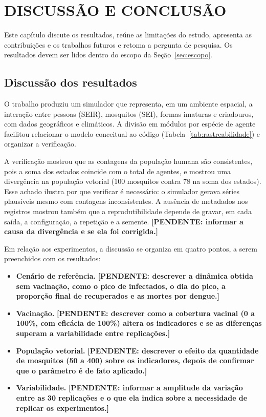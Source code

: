 \chapter{DISCUSSÃO E CONCLUSÃO}
\label{cap:conclusao}

Este capítulo discute os resultados, reúne as limitações do estudo, apresenta as contribuições e os trabalhos futuros e retoma a pergunta de pesquisa. Os resultados devem ser lidos dentro do escopo da Seção~\ref{sec:escopo}.

\section{Discussão dos resultados}

O trabalho produziu um simulador que representa, em um ambiente espacial, a interação entre pessoas (SEIR), mosquitos (SEI), formas imaturas e criadouros, com dados geográficos e climáticos. A divisão em módulos por espécie de agente facilitou relacionar o modelo conceitual ao código (Tabela~\ref{tab:rastreabilidade}) e organizar a verificação.

A verificação mostrou que as contagens da população humana são consistentes, pois a soma dos estados coincide com o total de agentes, e mostrou uma divergência na população vetorial (100 mosquitos contra 78 na soma dos estados). Esse achado ilustra por que verificar é necessário: o simulador gerava séries plausíveis mesmo com contagens inconsistentes. A ausência de metadados nos registros mostrou também que a reprodutibilidade depende de gravar, em cada saída, a configuração, a repetição e a semente. \textbf{[PENDENTE: informar a causa da divergência e se ela foi corrigida.]}

Em relação aos experimentos, a discussão se organiza em quatro pontos, a serem preenchidos com os resultados:

\begin{itemize}
    \item \textbf{Cenário de referência.} \textbf{[PENDENTE: descrever a dinâmica obtida sem vacinação, como o pico de infectados, o dia do pico, a proporção final de recuperados e as mortes por dengue.]}
    \item \textbf{Vacinação.} \textbf{[PENDENTE: descrever como a cobertura vacinal (0 a 100\%, com eficácia de 100\%) altera os indicadores e se as diferenças superam a variabilidade entre replicações.]}
    \item \textbf{População vetorial.} \textbf{[PENDENTE: descrever o efeito da quantidade de mosquitos (50 a 400) sobre os indicadores, depois de confirmar que o parâmetro é de fato aplicado.]}
    \item \textbf{Variabilidade.} \textbf{[PENDENTE: informar a amplitude da variação entre as 30 replicações e o que ela indica sobre a necessidade de replicar os experimentos.]}
\end{itemize}

